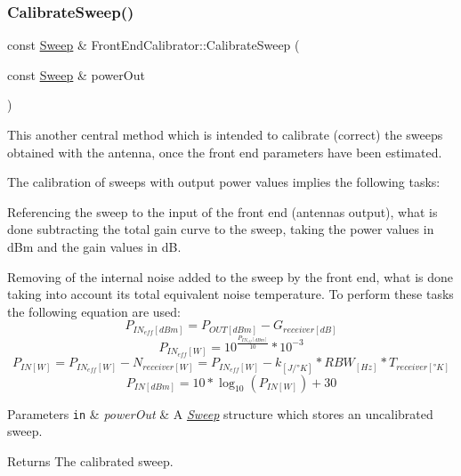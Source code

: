 \subsubsection{\texorpdfstring{Calibrate\+Sweep()}{CalibrateSweep()}}
{\footnotesize\ttfamily const \hyperlink{structSweep}{Sweep} \& Front\+End\+Calibrator\+::\+Calibrate\+Sweep (\begin{DoxyParamCaption}\item[{const \hyperlink{structSweep}{Sweep} \&}]{power\+Out }\end{DoxyParamCaption})}



This another central method which is intended to calibrate (correct) the sweeps obtained with the antenna, once the front end parameters have been estimated. 

The calibration of sweeps with output power values implies the following tasks\+:
\begin{DoxyItemize}
\item Referencing the sweep to the input of the front end (antenna\textquotesingle{}s output), what is done subtracting the total gain curve to the sweep, taking the power values in d\+Bm and the gain values in dB.
\item Removing of the internal noise added to the sweep by the front end, what is done taking into account its total equivalent noise temperature. To perform these tasks the following equation are used\+: \[ P_{IN_{eff}[dBm]}=P_{OUT[dBm]}-G_{receiver[dB]} \] \[ P_{IN_{eff}[W]}=10^{\frac{P_{IN_{eff}[dBm]}}{10}}*10^{-3} \] \[ P_{IN[W]}=P_{IN_{eff}[W]}-N_{receiver[W]}=P_{IN_{eff}[W]}-k_{[J/°K]}*RBW_{[Hz]}*T_{receiver[°K]} \] \[ P_{IN[dBm]}=10*\log_{10}(P_{IN[W]})+30 \] 
\begin{DoxyParams}[1]{Parameters}
\mbox{\tt in}  & {\em power\+Out} & A {\itshape \hyperlink{structSweep}{Sweep}} structure which stores an uncalibrated sweep. \\
\hline
\end{DoxyParams}
\begin{DoxyReturn}{Returns}
The calibrated sweep. 
\end{DoxyReturn}

\end{DoxyItemize}\mbox{\label{classFrontEndCalibrator_a2d643afa2c6bcf15b0f051cdc34855c2}} 
